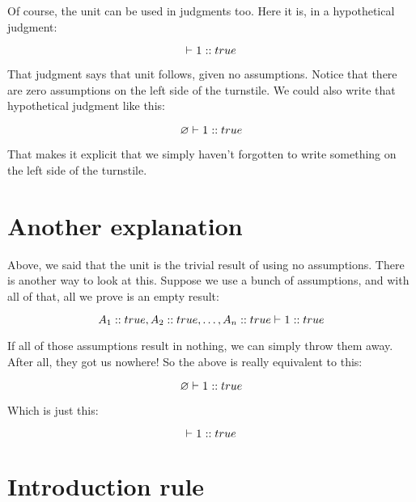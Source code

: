 \documentclass[../../../main.tex]{subfiles}
\begin{document}
Of course, the unit can be used in judgments too. Here it is, in a hypothetical judgment:

\begin{equation*}
  \ndturnstile/ \unit/ :: true
\end{equation*}

\noindent
That judgment says that unit follows, given no assumptions. Notice that there are zero assumptions on the left side of the turnstile. We could also write that hypothetical judgment like this:

\begin{equation*}
  \emptyassumptions/ \ndturnstile/ \unit/ :: true
\end{equation*}

\noindent
That makes it explicit that we simply haven't forgotten to write something on the left side of the turnstile.


\section{Another explanation}

Above, we said that the unit is the trivial result of using no assumptions. There is another way to look at this. Suppose we use a bunch of assumptions, and with all of that, all we prove is an empty result:

\begin{equation*}
  A_{1} :: true, A_{2} :: true, \ldots, A_{n} :: true \ndturnstile/ \unit/ :: true
\end{equation*}

\noindent
If all of those assumptions result in nothing, we can simply throw them away. After all, they got us nowhere! So the above is really equivalent to this:

\begin{equation*}
  \emptyassumptions/ \ndturnstile/ \unit/ :: true
\end{equation*}

\noindent
Which is just this:

\begin{equation*}
  \ndturnstile/ \unit/ :: true
\end{equation*}


\section{Introduction rule}
\end{document}
